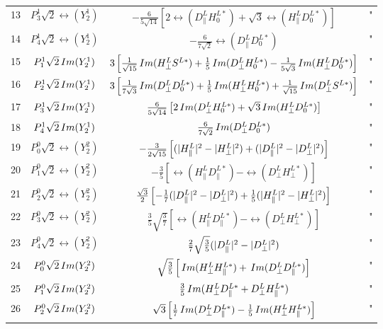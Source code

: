 \begin{tabular}{lccc}
 13  &   $P^1_3 \sqrt{2}\rel(Y^1_2)$ &  $-\frac{6}{5 \sqrt{14}} \left[2 \rel(D^L_\parallel H^{L\ast}_0)  + \sqrt{3} \rel(H^L_\parallel D^{L\ast}_0 ) \right] $ & " \\  
 14  &   $P^1_4 \sqrt{2}\rel(Y^1_2)$ &  $- \frac{6}{7\sqrt{2}} \rel(D^L_\parallel D^{L\ast}_0)$  & " \\  
 15  &   $P^1_1 \sqrt{2}\, Im(Y^1_2)$ &  $3 \left[ \frac{1}{\sqrt{15}} \, Im(H^L_\perp S^{L\ast}) + \frac{1}{5} \, Im(D^L_\perp H^{L\ast}_0) - \frac{1}{5 \sqrt{3}}  \, Im(H^L_\perp D^{L\ast}_0) \right]  $  & " \\  
 16  &   $P^1_2 \sqrt{2}\, Im(Y^1_2)$ &  $ 3\left[ \frac{1}{7 \sqrt{3}} \, Im(D^L_\perp D^{L\ast}_0)  + \frac{1}{5} \, Im(H^L_\perp H^{L\ast}_0)  + \frac{1}{\sqrt{15}} \, Im(D^L_\perp S^{L\ast})   \right] $  & " \\
 17  &   $P^1_3 \sqrt{2}\, Im(Y^1_2)$ &  $\frac{6}{5 \sqrt{14}} \left[ 2 \, Im(D^L_\perp H^{L\ast}_0)  + \sqrt{3} \, Im(H^L_\perp D^{L\ast}_0) \right]  $   & " \\  
 18  &   $P^1_4 \sqrt{2}\, Im(Y^1_2)$ &  $\frac{6}{7\sqrt{2}} \, Im(D^L_\perp D^{L\ast}_0)$  & " \\  
 19  &   $P^0_0 \sqrt{2}\rel(Y^2_2)$ &  $-\frac{3}{2\sqrt{15}} \left[ (|H^L_\parallel|^2 - |H^L_\perp|^2) + (|D^L_\parallel|^2 - |D^L_\perp|^2) \right] $  & " \\  
 20  &   $P^0_1 \sqrt{2}\rel(Y^2_2)$ &  $-\frac{3}{5} \left[ \rel(H^L_\parallel D^{L\ast}_\parallel)   - \rel(D^L_\perp H^{L\ast}_\perp) \right] $  & " \\  
 21  &   $P^0_2 \sqrt{2}\rel(Y^2_2)$ &  $\frac{\sqrt{3}}{2} \left[ - \frac{1}{7} (|D^L_\parallel|^2 - |D^L_\perp|^2)   + \frac{1}{5} ( |H^L_\parallel|^2 - |H^L_\perp|^2 ) \right] $  & " \\  
 22  &   $P^0_3 \sqrt{2}\rel(Y^2_2)$ &  $\frac{3}{5} \sqrt{ \frac{3}{7}} \left[ \rel(H^L_\parallel D^{L\ast}_\parallel)   - \rel(D^L_\perp H^{L\ast}_\perp) \right] $  & " \\ 
 23  &   $P^0_4 \sqrt{2}\rel(Y^2_2)$ &  $\frac{2}{7} \sqrt{ \frac{3}{5}}  (|D^L_\parallel|^2 - |D^L_\perp|^2) $ & " \\  
 24  &   $P^0_0 \sqrt{2}\, Im(Y^2_2)$ &  $\sqrt{\frac{3}{5}} \left[ \, Im(H^L_\perp H^{L\ast}_\parallel) + \, Im(D^L_\perp D^{L\ast}_\parallel) \right] $   & " \\  
 25  &   $P^0_1 \sqrt{2}\, Im(Y^2_2)$ &  $\frac{3}{5} \, Im(  H^L_\perp D^{L\ast}_\parallel +  D^L_\perp H^{L\ast}_\parallel )  $  & " \\ 
 26  &   $P^0_2 \sqrt{2}\, Im(Y^2_2)$ &  $ \sqrt{3} \left[\frac{1}{7} \, Im(D^L_\perp D^{L\ast}_\parallel)   - \frac{1}{5} \, Im(H^L_\perp H^{L\ast}_\parallel)\right] $  & " \\

\end{tabular}
